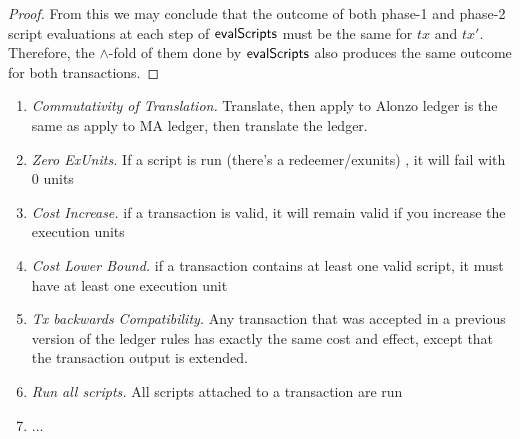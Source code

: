 \begin{property}
\begin{proof}
    From this we may conclude that the outcome of both phase-1 and phase-2 script evaluations
    at each step of $\mathsf{evalScripts}$ must be the same for $tx$ and $tx'$. Therefore,
    the $\wedge$-fold of them done by $\mathsf{evalScripts}$ also produces the same outcome
    for both transactions.

\end{proof}
\end{property}


\begin{enumerate}
\item
  \emph{Commutativity of Translation.} Translate, then apply to Alonzo ledger is
  the same as apply to MA ledger, then translate the ledger.
\item
  \emph{Zero ExUnits.} If a script is run (there’s a redeemer/exunits) , it will fail with 0 units
\item
  \emph{Cost Increase.} if a transaction is valid, it will remain valid if you increase the execution units
\item
  \emph{Cost Lower Bound.} if a transaction contains at least one valid script, it must have at least one execution unit
\item
  \emph{Tx backwards Compatibility.} Any transaction that was accepted in a previous version of the ledger rules
    has exactly the same cost and effect, except that the transaction output is extended.
\item \emph{Run all scripts.} All scripts attached to a transaction are run
\item
  ... 
\end{enumerate}
